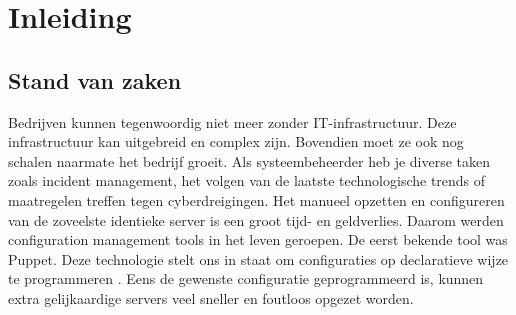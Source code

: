 
\chapter{Inleiding}
\label{ch:inleiding}



\section{Stand van zaken}
\label{sec:stand-van-zaken}

Bedrijven kunnen tegenwoordig niet meer zonder IT-infrastructuur. Deze infrastructuur kan uitgebreid en complex zijn. Bovendien moet ze ook nog schalen naarmate het bedrijf groeit. Als systeembeheerder heb je diverse taken zoals incident management, het volgen van de laatste technologische trends of maatregelen treffen tegen cyberdreigingen. Het manueel opzetten en configureren van de zoveelste identieke server is een groot tijd- en geldverlies. Daarom werden configuration management tools in het leven geroepen. De eerst bekende tool was Puppet. Deze technologie stelt ons in staat om configuraties op declaratieve wijze te programmeren \autocite{PuppetDeclaratief}. Eens de gewenste configuratie geprogrammeerd is, kunnen extra gelijkaardige servers veel sneller en foutloos opgezet worden. 

